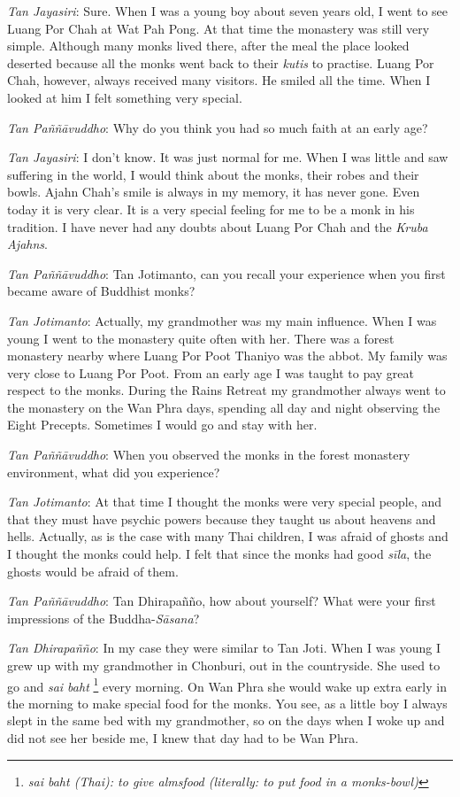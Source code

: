 \emph{Tan Jayasiri}: Sure. When I was a young boy about seven years old,
I went to see Luang Por Chah at Wat Pah Pong. At that time the monastery
was still very simple. Although many monks lived there, after the meal
the place looked deserted because all the monks went back to their
\emph{kutis} to practise. Luang Por Chah, however, always received many
visitors. He smiled all the time. When I looked at him I felt something
very special.

\emph{Tan Paññāvuddho}‎: Why do you think you had so much faith at an
early age?

\emph{Tan Jayasiri}: I don't know. It was just normal for me. When I was
little and saw suffering in the world, I would think about the monks,
their robes and their bowls. Ajahn Chah's smile is always in my memory,
it has never gone. Even today it is very clear. It is a very special
feeling for me to be a monk in his tradition. I have never had any
doubts about Luang Por Chah and the \emph{Kruba Ajahns‎‎}.

\emph{Tan Paññāvuddho}‎: Tan Jotimanto, can you recall your experience
when you first became aware of Buddhist monks?

\emph{Tan Jotimanto}: Actually, my grandmother was my main influence.
When I was young I went to the monastery quite often with her. There was
a forest monastery nearby where Luang Por Poot Thaniyo was the abbot. My
family was very close to Luang Por Poot. From an early age I was taught
to pay great respect to the monks. During the Rains Retreat my
grandmother always went to the monastery on the Wan Phra days, spending
all day and night observing the Eight Precepts. Sometimes I would go and
stay with her.

\emph{Tan Paññāvuddho}‎: When you observed the monks in the forest
monastery environment, what did you experience?

\emph{Tan Jotimanto}: At that time I thought the monks were very special
people, and that they must have psychic powers because they taught us
about heavens and hells. Actually, as is the case with many Thai
children, I was afraid of ghosts and I thought the monks could help. I
felt that since the monks had good \emph{sīla}, the ghosts would be
afraid of them.

\emph{Tan Paññāvuddho}‎: Tan Dhirapañño, how about yourself? What were
your first impressions of the Buddha-\emph{Sāsana}?

\emph{Tan Dhirapañño}: In my case they were similar to Tan Joti. When I
was young I grew up with my grandmother in Chonburi, out in the
countryside. She used to go and \emph{sai baht} \footnote{\emph{sai baht
  (Thai): to give almsfood (literally: to put food in a monks-bowl)}}
every morning. On Wan Phra she would wake up extra early in the morning
to make special food for the monks. You see, as a little boy I always
slept in the same bed with my grandmother, so on the days when I woke up
and did not see her beside me, I knew that day had to be Wan Phra.

